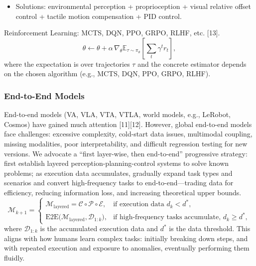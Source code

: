 \documentclass[12pt,a4paper]{article}
\begin{document}
\begin{itemize}
\begin{equation}
\epsilon_{\mathrm{total}}=\epsilon_{\mathrm{calibration}}+\epsilon_{\mathrm{assembly}}+\epsilon_{\mathrm{zero}}+\epsilon_{\mathrm{actuation}}+\epsilon_{\mathrm{perception}},
\label{eq:error-composition}
\end{equation}
where the components denote the corresponding cumulative error sources.
\item Solutions: environmental perception + proprioception + visual relative offset control + tactile motion compensation + PID control.
\end{itemize}

Reinforcement Learning: MCTS, DQN, PPO, GRPO, RLHF, etc. [13].
\begin{equation}
\theta\leftarrow\theta+\alpha\,\nabla_{\theta}\mathbb{E}_{\tau\sim\pi_{\theta}}\left[\sum_{t}\gamma^{t}r_t\right],
\label{eq:rl-update}
\end{equation}
where the expectation is over trajectories $\tau$ and the concrete estimator depends on the chosen algorithm (e.g., MCTS, DQN, PPO, GRPO, RLHF).

\subsubsection{End-to-End Models}
End-to-end models (VA, VLA, VTA, VTLA, world models, e.g., LeRobot, Cosmos) have gained much attention [11][12]. However, global end-to-end models face challenges: excessive complexity, cold-start data issues, multimodal coupling, missing modalities, poor interpretability, and difficult regression testing for new versions. We advocate a ``first layer-wise, then end-to-end'' progressive strategy: first establish layered perception-planning-control systems to solve known problems; as execution data accumulates, gradually expand task types and scenarios and convert high-frequency tasks to end-to-end---trading data for efficiency, reducing information loss, and increasing theoretical upper bounds.
\begin{equation}
\mathcal{M}_{k+1}=
\begin{cases}
\mathcal{M}_{\mathrm{layered}} = \mathcal{C}\circ\mathcal{P}\circ\mathcal{E}, & \text{if execution data } d_k<d^{*},\\[3pt]
\mathrm{E2E}\bigl(\mathcal{M}_{\mathrm{layered}},\mathcal{D}_{1:k}\bigr), & \text{if high-frequency tasks accumulate, } d_k\ge d^{*},
\end{cases}
\label{eq:layered-to-e2e}
\end{equation}
where $\mathcal{D}_{1:k}$ is the accumulated execution data and $d^{*}$ is the data threshold. This aligns with how humans learn complex tasks: initially breaking down steps, and with repeated execution and exposure to anomalies, eventually performing them fluidly.
\end{document}
